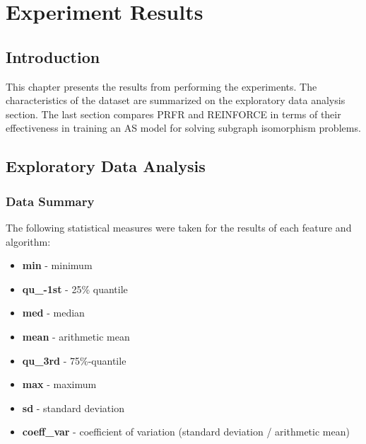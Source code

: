 \chapter{Experiment Results}

\section{Introduction}
This chapter presents the results from performing the experiments. The characteristics of the dataset are summarized on the exploratory data analysis section. The last section compares PRFR and REINFORCE in terms of their effectiveness in training an AS model for solving subgraph isomorphism problems.

\section{Exploratory Data Analysis}
\subsection{Data Summary}

The following statistical measures were taken for the results of each feature and algorithm:

\begin{itemize}
	\item \textbf{min} - minimum
	\item \textbf{qu\_-1st} - 25\% quantile
	\item \textbf{med} - median
	\item \textbf{mean} -  arithmetic mean
	\item \textbf{qu\_3rd} - 75\%-quantile
	\item \textbf{max} - maximum
	\item \textbf{sd} - standard deviation
	\item \textbf{coeff\_var} - coefficient of variation (standard deviation / arithmetic mean)
\end{itemize}

